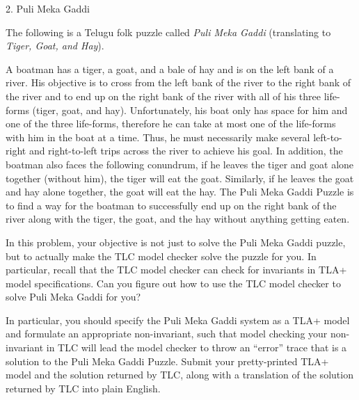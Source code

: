 \documentclass[12pt]{article}
\begin{document}
\newpage

\begin{problem}{2. Puli Meka Gaddi}

The following is a Telugu folk puzzle called \emph{Puli Meka Gaddi} (translating to \emph{Tiger, Goat, and Hay}).

A boatman has a tiger, a goat, and a bale of hay and is on the left bank of a river. His objective is to cross from the left bank of the river to the right bank of the river and to end up on the right bank of the river with all of his three life-forms (tiger, goat, and hay). Unfortunately, his boat only has space for him and one of the three life-forms, therefore he can take at most one of the life-forms with him in the boat at a time. Thus, he must necessarily make several left-to-right and right-to-left trips across the river to achieve his goal. In addition, the boatman also faces the following conundrum, if he leaves the tiger and goat alone together (without him), the tiger will eat the goat. Similarly, if he leaves the goat and hay alone together, the goat will eat the hay. The Puli Meka Gaddi Puzzle is to find a way for the boatman to successfully end up on the right bank of the river along with the tiger, the goat, and the hay without anything getting eaten.

In this problem, your objective is not just to solve the Puli Meka Gaddi puzzle, but to actually make the TLC model checker solve the puzzle for you. In particular, recall that the TLC model checker can check for invariants in TLA+ model specifications. Can you figure out how to use the TLC model checker to solve Puli Meka Gaddi for you?

In particular, you should specify the Puli Meka Gaddi system as a TLA+ model and formulate an appropriate non-invariant, such that model checking your non-invariant in TLC will lead the model checker to throw an ``error'' trace that is a solution to the Puli Meka Gaddi Puzzle. Submit your pretty-printed TLA+ model and the solution returned by TLC, along with a translation of the solution returned by TLC into plain English.
\end{problem}
\end{document}
